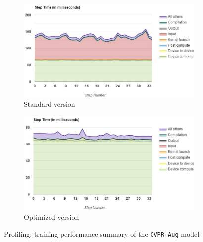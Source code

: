 \begin{figure}[!h]
	\begin{center}
		\begin{subfigure}[h]{0.47\textwidth}
			\centering
			\includegraphics[width=1\textwidth]{"contents/images/05-profiling-CVPRaug-std-summary"}
			\caption[]{Standard version}
		\end{subfigure}
		\hfill
		\begin{subfigure}[h]{0.47\textwidth}
			\centering
			\includegraphics[width=1\textwidth]{"contents/images/05-profiling-CVPRaug-opt-summary"}
			\caption[]{Optimized version}
		\end{subfigure}
	\end{center}
	\vspace{-0.5cm}
	\caption[Profiling: training performance summary of the \texttt{CVPR Aug} model]{Profiling: training performance summary of the \texttt{CVPR Aug} model}
	\label{fig:profiling-cvpraug-summary}
\end{figure}

